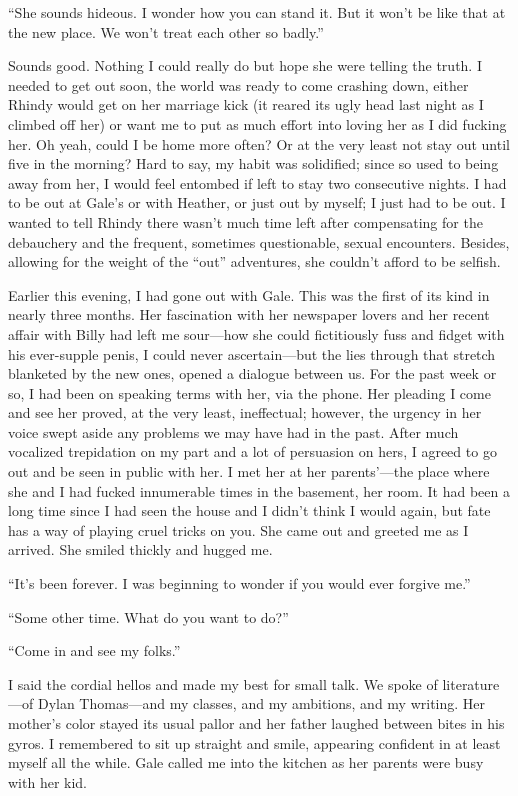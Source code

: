 ``She sounds hideous. I wonder how you can stand it. But it won't be
like that at the new place. We won't treat each other so badly.''

Sounds good. Nothing I could really do but hope she were telling the
truth. I needed to get out soon, the world was ready to come crashing
down, either Rhindy would get on her marriage kick (it reared its ugly
head last night as I climbed off her) or want me to put as much effort
into loving her as I did fucking her. Oh yeah, could I be home more
often? Or at the very least not stay out until five in the morning? Hard
to say, my habit was solidified; since so used to being away from her, I
would feel entombed if left to stay two consecutive nights. I had to be
out at Gale's or with Heather, or just out by myself; I just had to be
out. I wanted to tell Rhindy there wasn't much time left after
compensating for the debauchery and the frequent, sometimes
questionable, sexual encounters. Besides, allowing for the weight of the
``out'' adventures, she couldn't afford to be selfish.

Earlier this evening, I had gone out with Gale. This was the first of
its kind in nearly three months. Her fascination with her newspaper
lovers and her recent affair with Billy had left me sour---how she could
fictitiously fuss and fidget with his ever-supple penis, I could never
ascertain---but the lies through that stretch blanketed by the new ones,
opened a dialogue between us. For the past week or so, I had been on
speaking terms with her, via the phone. Her pleading I come and see her
proved, at the very least, ineffectual; however, the urgency in her
voice swept aside any problems we may have had in the past. After much
vocalized trepidation on my part and a lot of persuasion on hers, I
agreed to go out and be seen in public with her. I met her at her
parents'---the place where she and I had fucked innumerable times in the
basement, her room. It had been a long time since I had seen the house
and I didn't think I would again, but fate has a way of playing cruel
tricks on you. She came out and greeted me as I arrived. She smiled
thickly and hugged me.

``It's been forever. I was beginning to wonder if you would ever forgive
me.''

``Some other time. What do you want to do?''

``Come in and see my folks.''

I said the cordial hellos and made my best for small talk. We spoke of
literature---of Dylan Thomas---and my classes, and my ambitions, and my
writing. Her mother's color stayed its usual pallor and her father
laughed between bites in his gyros. I remembered to sit up straight and
smile, appearing confident in at least myself all the while. Gale called
me into the kitchen as her parents were busy with her kid.

